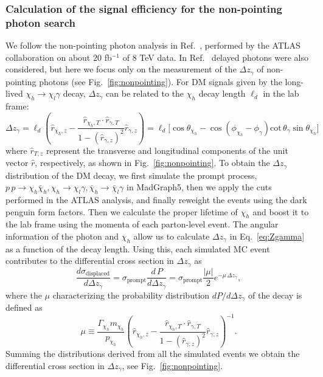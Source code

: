 \subsubsection{Calculation of the signal efficiency for the non-pointing photon search}
%
We follow the non-pointing photon analysis in Ref.~\cite{Aad:2014gfa}, performed
by the ATLAS collaboration on about $20$ fb$^{-1}$ of $8$ TeV data. In
Ref.~\cite{Aad:2014gfa} delayed photons were also considered, but here we focus
only on the measurement of the $\Delta z_{\gamma}$ of non-pointing photons (see
Fig.~\ref{fig:nonpointing}). For DM signals given by the long-lived
$\chi_h\to\chi_l\gamma$ decay, $\Delta z_{\gamma}$ can be related to the
$\chi_h$ decay length $\ell_{d}$ in the lab frame:
\begin{equation}\label{eq:Zgamma}
\Delta z_{\gamma}=\ell_d\left(\hat{r}_{\chi_h,z}-\frac{\hat{r}_{\chi_h,T}\cdot\hat{r}_{\gamma,T}}{1-(\hat{r}_{\gamma,z})^2}\hat{r}_{\gamma,z}\right) = \ell_d \Big[\cos\theta_{\chi_h} -\cos (\phi_{\chi_h} - \phi_\gamma)\mathrm{cot}\,\theta_\gamma \sin \theta_{\chi_h} \Big]
\end{equation}
where $\hat{r}_{T,z}$ represent the transverse and longitudinal components of
the unit vector $\hat{r}$, respectively, as shown in Fig.~\ref{fig:nonpointing}.
To obtain the $\Delta z_{\gamma}$ distribution of the DM decay, we first
simulate the prompt process, $p\,p \to \chi_h\bar{\chi}_h,
\chi_h\to\chi_l\gamma, \bar{\chi}_h\to\bar{\chi}_l\gamma$ in MadGraph5, then we
apply the cuts performed in the ATLAS analysis, and finally reweight the events
using the dark penguin form factors. Then we calculate the proper lifetime of
$\chi_h$ and boost it to the lab frame using the momenta of each parton-level
event. The angular information of the photon and $\chi_h$ allow us to calculate
$\Delta z_{\gamma}$ in Eq.~\eqref{eq:Zgamma} as a function of the decay length.
Using this, each simulated MC event contributes to the differential cross
section in $\Delta z_{\gamma}$ as
\begin{equation} \label{eq:displdistr}
\frac{d\sigma_{\text{displaced}}}{d\Delta z_{\gamma}} =\sigma_{\text{prompt}}\frac{d\,P}{d\Delta z_{\gamma}}=\sigma_{\text{prompt}}\frac{|\mu|}{2} e^{-\mu\,\Delta z_{\gamma}},
\end{equation}
where the $\mu$ characterizing the probability distribution $dP/d\Delta z_\gamma$ of the decay is defined as
\begin{equation}
\mu\equiv\frac{\Gamma_{\chi_h}m_{\chi_h}}{p_{\chi_h}}\left(\hat{r}_{\chi_h,z}-\frac{\hat{r}_{\chi_h,T}\cdot\hat{r}_{\gamma,T}}{1-(\hat{r}_{\gamma,z})^2}\hat{r}_{\gamma,z}\right)^{-1}.
\end{equation}
Summing the distributions derived from all the simulated events we obtain the
differential cross section in $\Delta z_\gamma$, see Fig.~\ref{fig:nonpointing}.

